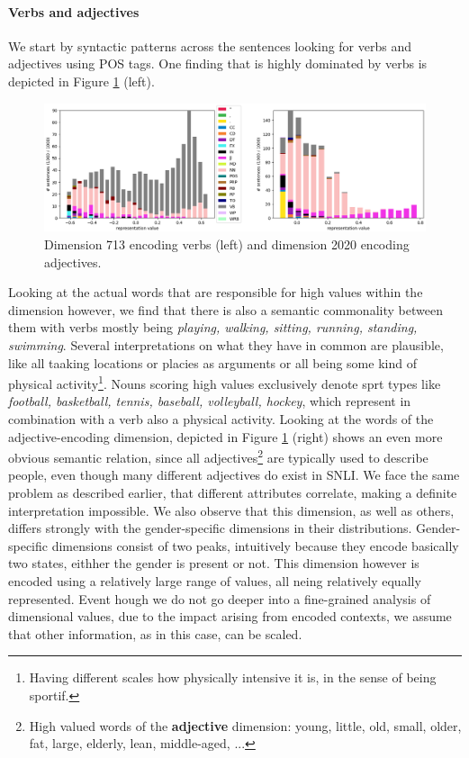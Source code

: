 \paragraph*{Verbs and adjectives}
We start by syntactic patterns across the sentences looking for verbs and adjectives using \ac{POS} tags. One finding that is highly dominated by verbs is depicted in Figure \ref{fig:find_syntax_vb} (left).
\begin{figure}[tph!]
\centering
	\includegraphics[totalheight=6cm]{fig/find_syntax_vb.png}
	\caption{Dimension 713 encoding verbs (left) and dimension 2020 encoding adjectives.}
	\label{fig:find_syntax_vb}
\end{figure}
Looking at the actual words that are responsible for high values within the dimension however, we find that there is also a semantic commonality between them with verbs mostly being \textit{playing, walking, sitting, running, standing, swimming}. Several interpretations on what they have in common are plausible, like all taaking locations or placies as arguments or all being some kind of physical activity\footnote{Having different scales how physically intensive it is, in the sense of being sportif.}. Nouns scoring high values exclusively denote sprt types like \textit{football, basketball, tennis, baseball, volleyball, hockey}, which represent in combination with a verb also a physical activity. Looking at the words of the adjective-encoding dimension, depicted in Figure \ref{fig:find_syntax_vb} (right) shows an even more obvious semantic relation, since all adjectives\footnote{High valued words of the \textbf{adjective} dimension: young, little, old, small, older, fat, large, elderly, lean, middle-aged, ...} are typically used to describe people, even though many different adjectives do exist in \ac{SNLI}. We face the same problem as described earlier, that different attributes correlate, making a definite interpretation impossible. We also observe that this dimension, as well as others, differs strongly with the gender-specific dimensions in their distributions. Gender-specific dimensions consist of two peaks, intuitively because they encode basically two states, eithher the gender is present or not. This dimension however is encoded using a relatively large range of values, all neing relatively equally represented. Event hough we do not go deeper into a fine-grained analysis of dimensional values, due to the impact arising from encoded contexts, we assume that other information, as in this case, can be scaled. 
